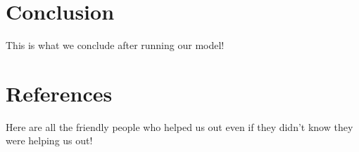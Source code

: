 \documentclass[paper.tex]{subfiles}
\begin{document}
	\section{Conclusion}
	This is what we conclude after running our model!
	
	\section{References}
	Here are all the friendly people who helped us out even if they didn't know they were helping us out!
\end{document}

